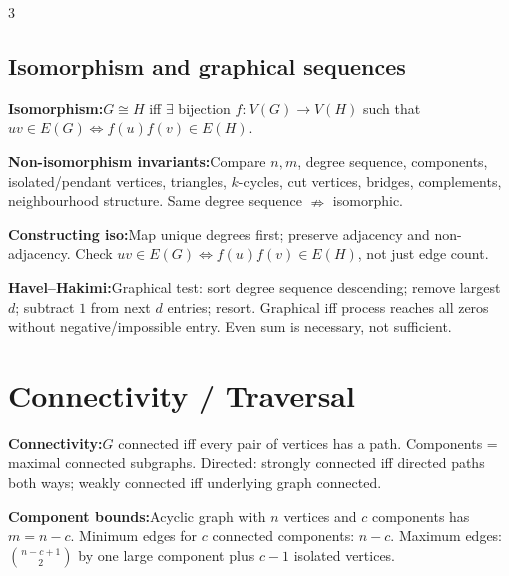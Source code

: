 \documentclass[10pt]{article}
\newenvironment{cheatitems}{\par\vspace{-1pt}}{\par\vspace{-1pt}}
\newcommand{\cheatrow}[2]{\par\noindent\textbf{#1:}\enspace #2\par}
\begin{document}
\begin{multicols}{3}
\subsection*{Isomorphism and graphical sequences}
\begin{cheatitems}
\cheatrow{Isomorphism}{$G\cong H$ iff $\exists$ bijection $f:V(G)\to V(H)$ such that $uv\in E(G)\Leftrightarrow f(u)f(v)\in E(H)$.}
\cheatrow{Non-isomorphism invariants}{Compare $n,m$, degree sequence, components, isolated/pendant vertices, triangles, $k$-cycles, cut vertices, bridges, complements, neighbourhood structure. Same degree sequence $\nRightarrow$ isomorphic.}
\cheatrow{Constructing iso}{Map unique degrees first; preserve adjacency and non-adjacency. Check $uv\in E(G)\iff f(u)f(v)\in E(H)$, not just edge count.}
\cheatrow{Havel--Hakimi}{Graphical test: sort degree sequence descending; remove largest $d$; subtract $1$ from next $d$ entries; resort. Graphical iff process reaches all zeros without negative/impossible entry. Even sum is necessary, not sufficient.}
\end{cheatitems}

\section*{Connectivity / Traversal}
\begin{cheatitems}
\cheatrow{Connectivity}{$G$ connected iff every pair of vertices has a path. Components = maximal connected subgraphs. Directed: strongly connected iff directed paths both ways; weakly connected iff underlying graph connected.}
\cheatrow{Component bounds}{Acyclic graph with $n$ vertices and $c$ components has $m=n-c$. Minimum edges for $c$ connected components: $n-c$. Maximum edges: $\binom{n-c+1}{2}$ by one large component plus $c-1$ isolated vertices.}
\end{cheatitems}


\end{multicols}
\end{document}
